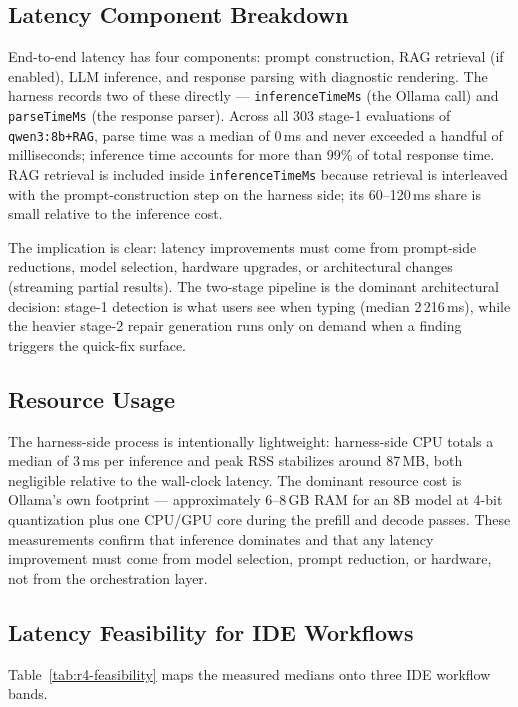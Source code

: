 \subsection{Latency Component Breakdown}

End-to-end latency has four components: prompt construction, RAG retrieval (if enabled), LLM inference, and response parsing with diagnostic rendering. The harness records two of these directly --- \texttt{inferenceTimeMs} (the Ollama call) and \texttt{parseTimeMs} (the response parser). Across all 303 stage-1 evaluations of \texttt{qwen3:8b+RAG}, parse time was a median of 0\,ms and never exceeded a handful of milliseconds; inference time accounts for more than 99\% of total response time. RAG retrieval is included inside \texttt{inferenceTimeMs} because retrieval is interleaved with the prompt-construction step on the harness side; its 60--120\,ms share is small relative to the inference cost.

The implication is clear: latency improvements must come from prompt-side reductions, model selection, hardware upgrades, or architectural changes (streaming partial results). The two-stage pipeline is the dominant architectural decision: stage-1 detection is what users see when typing (median 2\,216\,ms), while the heavier stage-2 repair generation runs only on demand when a finding triggers the quick-fix surface.

\subsection{Resource Usage}
\label{sec:eval-r4-resources}

The harness-side process is intentionally lightweight: harness-side CPU totals a median of 3\,ms per inference and peak RSS stabilizes around 87\,MB, both negligible relative to the wall-clock latency. The dominant resource cost is Ollama's own footprint --- approximately 6--8\,GB RAM for an 8B model at 4-bit quantization plus one CPU/GPU core during the prefill and decode passes. These measurements confirm that inference dominates and that any latency improvement must come from model selection, prompt reduction, or hardware, not from the orchestration layer.

\subsection{Latency Feasibility for IDE Workflows}

Table~\ref{tab:r4-feasibility} maps the measured medians onto three IDE workflow bands.

